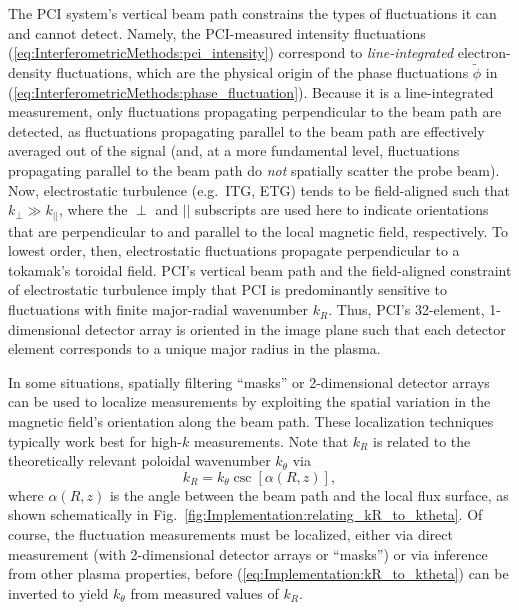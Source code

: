 The PCI system's vertical beam path constrains
the types of fluctuations it can and cannot detect.
Namely, the PCI-measured intensity fluctuations
(\ref{eq:InterferometricMethods:pci_intensity})
correspond to \emph{line-integrated} electron-density fluctuations, which
are the physical origin of the phase fluctuations $\tilde{\phi}$ in
(\ref{eq:InterferometricMethods:phase_fluctuation}).
Because it is a line-integrated measurement,
only fluctuations propagating perpendicular to the beam path are detected,
as fluctuations propagating parallel to the beam path
are effectively averaged out of the signal
\graffito{\textcolor{red}{what about $\delta \omega$?}}
(and, at a more fundamental level, fluctuations propagating
parallel to the beam path do \emph{not} spatially scatter the probe beam).
\graffito{\textcolor{red}{citation? Wesson?}}
Now, electrostatic turbulence (e.g.\ ITG, ETG) tends to be field-aligned
such that $k_{\perp} \gg k_{||}$, where
the $\perp$ and $||$ subscripts are used here to indicate
orientations that are perpendicular to and parallel to
the local magnetic field, respectively.
To lowest order, then, electrostatic fluctuations propagate
perpendicular to a tokamak's toroidal field.
PCI's vertical beam path and
the field-aligned constraint of electrostatic turbulence
imply that PCI is predominantly sensitive to fluctuations
with finite major-radial wavenumber $k_R$.
Thus, PCI's 32-element, 1-dimensional detector array
is oriented in the image plane such that
each detector element corresponds to a unique major radius in the plasma.

In some situations, spatially filtering ``masks''
\cite{dorris_rsi09, dorris_phd, lin_rsi06} or
2-dimensional detector arrays
\cite{sanin_rsi04, tanaka_rsi16}
can be used to localize measurements
by exploiting the spatial variation
in the magnetic field's orientation along the beam path.
These localization techniques typically work best
for high-$k$ measurements.
Note that $k_R$ is related to the
theoretically relevant poloidal wavenumber $k_{\theta}$ via
\begin{equation}
  k_R = k_{\theta} \csc[\alpha(R, z)],
  \label{eq:Implementation:kR_to_ktheta}
\end{equation}
where $\alpha(R, z)$ is the angle
between the beam path and the local flux surface,
as shown schematically in
Fig.~\ref{fig:Implementation:relating_kR_to_ktheta}.
Of course, the fluctuation measurements must be localized,
either via direct measurement
(with 2-dimensional detector arrays or ``masks'')
or via inference from other plasma properties,
before (\ref{eq:Implementation:kR_to_ktheta})
can be inverted to yield $k_{\theta}$
from measured values of $k_R$.

